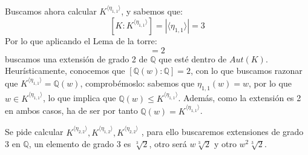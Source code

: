 \begin{ejemplo}
    \noindent
    Buscamos ahora calcular $K^{\langle \eta_{1,1} \rangle }$, y sabemos que:
    \begin{equation*}
        \left[K:K^{\langle \eta_{1,1} \rangle }\right] = |\langle \eta_{1,1} \rangle | = 3
    \end{equation*}
    Por lo que aplicando el Lema de la torre:
    \begin{equation*}
        [K^{\eta_{1,1}}:\mathbb{Q}] = 2
    \end{equation*}
    buscamos una extensión de grado 2 de $\mathbb{Q}$ que esté dentro de $Aut(K)$. Heurísticamente, conocemos que $[\mathbb{Q}(w):\mathbb{Q}] = 2$, con lo que buscamos razonar que $K^{\langle \eta_{1,1} \rangle } = \mathbb{Q}(w)$, comprobémoslo: sabemos que $\eta_{1,1}(w) = w$, por lo que $w\in K^{\langle \eta_{1,1} \rangle }$, lo que implica que $\mathbb{Q}(w)\leq K^{\langle \eta_{1,1} \rangle }$. Además, como la extensión es 2 en ambos casos, ha de ser por tanto $\mathbb{Q}(w) = K^{\langle \eta_{1,1} \rangle }$.

    \noindent
    Se pide calcular $K^{\langle \eta_{2,2} \rangle }, K^{\langle \eta_{1,2} \rangle }, K^{\langle \eta_{2,2} \rangle }$ , para ello buscaremos extensiones de grado 3 en $\mathbb{Q}$, un elemento de grado 3 es $\sqrt[3]{2}$, otro será $w\sqrt[3]{2}$ y otro $w^2\sqrt[3]{2}$.
\end{ejemplo}




